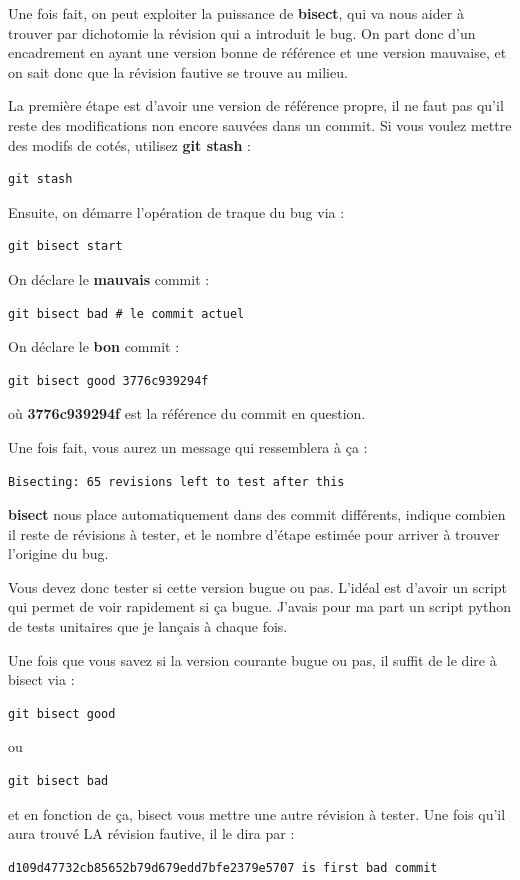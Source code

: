 \documentclass[a4paper,twoside]{article}
\begin{document}
Une fois fait, on peut exploiter la puissance de \textbf{bisect}, qui va nous aider à trouver par dichotomie la révision qui a introduit le bug. On part donc d'un encadrement en ayant une version bonne de référence et une version mauvaise, et on sait donc que la révision fautive se trouve au milieu.

\bigskip

La première étape est d'avoir une version de référence propre, il ne faut pas qu'il reste des modifications non encore sauvées dans un commit. Si vous voulez mettre des modifs de cotés, utilisez \textbf{git stash} : 
\begin{verbatim}
git stash
\end{verbatim}

Ensuite, on démarre l'opération de traque du bug via :
\begin{verbatim}
git bisect start
\end{verbatim}

On déclare le \textbf{mauvais} commit :
\begin{verbatim}
git bisect bad # le commit actuel
\end{verbatim}

On déclare le \textbf{bon} commit : 
\begin{verbatim}
git bisect good 3776c939294f
\end{verbatim}
où \textbf{3776c939294f} est la référence du commit en question. 

\bigskip

Une fois fait, vous aurez un message qui ressemblera à ça :
\begin{verbatim}
Bisecting: 65 revisions left to test after this
\end{verbatim}

\textbf{bisect} nous place automatiquement dans des commit différents, indique combien il reste de révisions à tester, et le nombre d'étape estimée pour arriver à trouver l'origine du bug. 

Vous devez donc tester si cette version bugue ou pas. L'idéal est d'avoir un script qui permet de voir rapidement si ça bugue. J'avais pour ma part un script python de tests unitaires que je lançais à chaque fois. 

Une fois que vous savez si la version courante bugue ou pas, il suffit de le dire à bisect via : 
\begin{verbatim}
git bisect good
\end{verbatim}
ou
\begin{verbatim}
git bisect bad
\end{verbatim}
et en fonction de ça, bisect vous mettre une autre révision à tester. Une fois qu'il aura trouvé LA révision fautive, il le dira par :
\begin{verbatim}
d109d47732cb85652b79d679edd7bfe2379e5707 is first bad commit
\end{verbatim}
\end{document}
